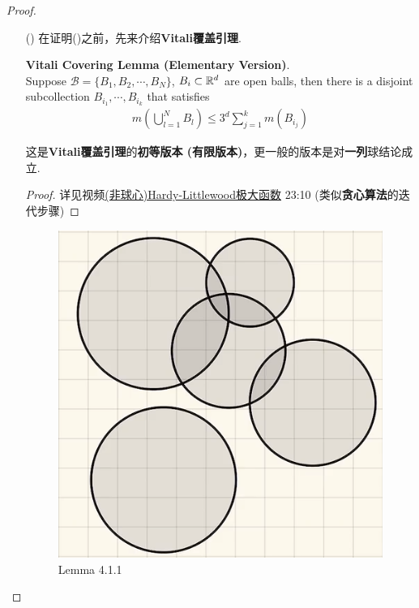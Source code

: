 \begin{proposition}
\begin{proof}
\begin{enumerate}
				\vspace{6em}
				
				\item[(\rmnum{3})]在证明()之前，先来介绍\textbf{Vitali覆盖引理}.
				
				\vspace{2em}
				
				\begin{lemma}\label{lemma 4.1.1}
					\textbf{Vitali Covering Lemma (Elementary Version)}. \\
					Suppose $\mathcal{B} = \{ B_1 , B_2 , \cdots , B_N \}$, $B_i \subset \mathbb{R}^d$ are open balls, then there is a disjoint subcollection $B_{i_1} , \cdots , B_{i_k}$ that satisfies
					\begin{align}
						m\left( \bigcup_{l = 1}^{N}{B_l} \right) 
						\leq 3^d \sum_{j = 1}^{k}{m(B_{i_j})}
					\end{align}
					
					\vspace{1em}
					\begin{rmk}
						这是\textbf{Vitali覆盖引理}的\textbf{初等版本 (有限版本)}，更一般的版本是对\textbf{一列}球结论成立.
					\end{rmk}
				
					\vspace{1em}
					\begin{proof}
						详见视频\href{https://www.bilibili.com/video/BV1FT411C7wM?p=31}{(非球心)Hardy-Littlewood极大函数} 23:10 (类似\textbf{贪心算法}的迭代步骤)
					\end{proof}
					
					\begin{figure}[thbp!]
						\centering
						\includegraphics[width=0.25\linewidth]{figure/4.1.1-1}
						\caption{Lemma 4.1.1}
						\label{pic : 4.1.1-1} %
					\end{figure}
				\end{lemma}
			
				\newpage
				

\end{enumerate}
\end{proof}
\end{proposition}
